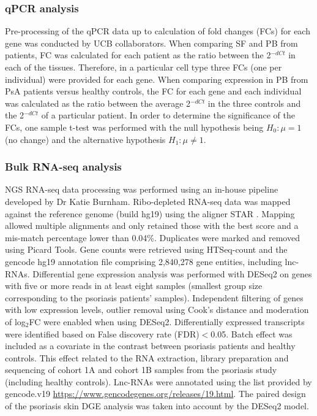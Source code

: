 \subsubsection{qPCR analysis}
Pre-processing of the qPCR data up to calculation of fold changes (FCs) for each gene was conducted by UCB collaborators. When comparing SF and PB from patients, FC was calculated for each patient as the ratio between the 2$^{-dCt}$ in each of the tissues. Therefore, in a particular cell type three FCs (one per individual) were provided for each gene. When comparing expression in PB from PsA patients versus healthy controls, the FC for each gene and each individual was calculated as the ratio between the average 2$^{-dCt}$ in the three controls and the 2$^{-dCt}$ of a particular patient. In order to determine the significance of the FCs, one sample t-test was performed with the null hypothesis being $H_0:\mu=1$ (no change) and the alternative hypothesis $H_1:\mu\neq 1$. 


\subsubsection{Bulk RNA-seq analysis}
NGS RNA-seq data processing was performed using an in-house pipeline developed by Dr Katie Burnham. Ribo-depleted RNA-seq data was mapped against the reference genome (build hg19) using the aligner STAR \parencite{Dobin2013}. Mapping allowed multiple alignments and only retained those with the best score and a mis-match percentage lower than 0.04\%. Duplicates were marked and removed using Picard Tools. Gene counts were retrieved using HTSeq-count and the gencode hg19 annotation file comprising 2,840,278 gene entities, including lnc-RNAs. Differential gene expression analysis was performed with DESeq2 on genes with five or more reads in at least eight samples (smallest group size corresponding to the psoriasis patients' samples). Independent filtering of genes with low expression levels, outlier removal using Cook's distance and moderation of log$_2$FC were enabled when using DESeq2. Differentially expressed transcripts were identified based on False discovery rate (FDR)$<$0.05. Batch effect was included as a covariate in the contrast between psoriasis patients and healthy controls. This effect related to the RNA extraction, library preparation and sequencing of cohort 1A and cohort 1B samples from the psoriasis study (including healthy controls). Lnc-RNAs were annotated using the list provided by gencode.v19 \url{https://www.gencodegenes.org/releases/19.html}. The paired design of the psoriasis skin DGE analysis was taken into account by the DESeq2 model.



